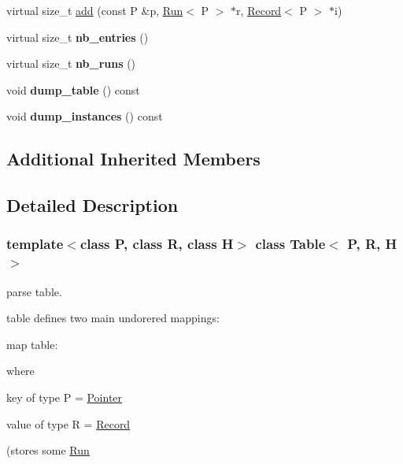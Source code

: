 \begin{DoxyCompactItemize}
virtual size\+\_\+t \mbox{\hyperlink{classTable_a9231e3b8782acfabbafe1f1dcb85a3bb}{add}} (const P \&p, \mbox{\hyperlink{classRun}{Run}}$<$ P $>$ $\ast$r, \mbox{\hyperlink{classRecord}{Record}}$<$ P $>$ $\ast$i)
\item 
\mbox{\label{classTable_aea047b02e7a9f2d714248903f52f5722}} 
virtual size\+\_\+t {\bfseries nb\+\_\+entries} ()
\item 
\mbox{\label{classTable_a8e4b509c921bf151b3601fca7704aaee}} 
virtual size\+\_\+t {\bfseries nb\+\_\+runs} ()
\item 
\mbox{\label{classTable_ab9f913aa0d90a65e1b70dc0a939e041c}} 
void {\bfseries dump\+\_\+table} () const
\item 
\mbox{\label{classTable_a3633b7419edf39e46aaeeef580171d36}} 
void {\bfseries dump\+\_\+instances} () const
\end{DoxyCompactItemize}
\subsection*{Additional Inherited Members}


\subsection{Detailed Description}
\subsubsection*{template$<$class P, class R, class H$>$\newline
class Table$<$ P, R, H $>$}

parse table. 

table defines two main undorered mappings\+:

map table\+: 
\begin{DoxyCode}{0}
\end{DoxyCode}
 where
\begin{DoxyItemize}
\item key of type P = \mbox{\hyperlink{classPointer}{Pointer}}
\item value of type R = \mbox{\hyperlink{classRecord}{Record}}
\end{DoxyItemize}

(stores some \mbox{\hyperlink{classRun}{Run}}

